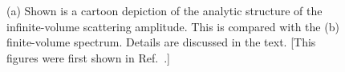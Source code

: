 \documentclass{iopart}
\theoremstyle{definition}
\begin{document}
{%
\begin{figure}[t]
\centering
{}
\hspace{1cm} 
\caption{(a) Shown is a cartoon depiction of the analytic structure of the infinite-volume scattering amplitude. This is compared with the (b) finite-volume spectrum. Details are discussed in the text. [This figures were first shown in Ref.~\cite{Briceno:2016cxt}.]
}
\label{fig:toy_spec} 
\end{figure}


}
\end{document}
